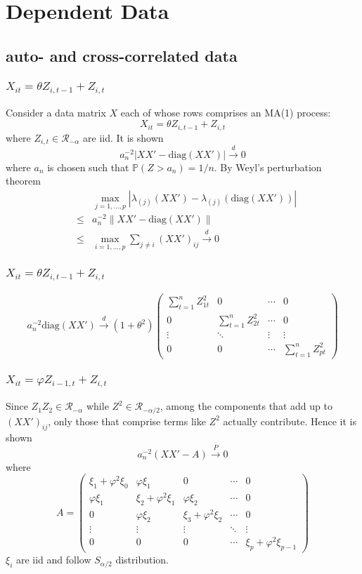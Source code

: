 \documentclass{beamer}
\renewcommand{\P}{
\mathbb P
}
\begin{document}

\section[dependent data]{Dependent Data}
\subsection{auto- and cross-correlated data}
\begin{frame}
\frametitle{$X_{it} = \theta Z_{i, t-1} + Z_{i, t}$}
Consider a data matrix $X$ each of whose rows comprises an MA(1) process:
$$
X_{it} = \theta Z_{i, t-1} + Z_{i, t}
$$
where $Z_{i,t} \in \mathcal R_{-\alpha}$ are iid. It is shown
$$
a_n^{-2} |XX' - \text{diag}(XX')| \overset{d}{\to} 0
$$
where $a_n$ is chosen such that $\P(Z > a_n) = 1/n$. By Weyl's perturbation
theorem
\begin{eqnarray*}
&& \max_{j=1,\dots,p}|\lambda_{(j)}(XX') - \lambda_{(j)}(\text{diag}(XX'))|\\
&\leq& a_n^{-2} \|XX' - \text{diag}(XX')\| \\
&\leq& \max_{i=1,\dots,p}\sum_{j \neq i}(XX')_{ij} \overset{d}{\to} 0
\end{eqnarray*}
\end{frame}

\begin{frame}
  \frametitle{$X_{it} = \theta Z_{i, t-1} + Z_{i, t}$}
  $$
  a_n^{-2}\text{diag}(XX') \overset{d}{\to} (1+\theta^2)
  \begin{pmatrix}
    \sum_{t=1}^n Z_{1t}^2 & 0 & \cdots & 0 \\
    0 & \sum_{t=1}^n Z_{2t}^2 & \cdots & 0 \\
    \vdots & \ddots & \vdots & \vdots \\
    0 & 0 & \cdots & \sum_{t=1}^n Z_{pt}^2
  \end{pmatrix}
  $$
\end{frame}

\begin{frame}
  \frametitle{$X_{it} = \varphi Z_{i-1, t} + Z_{i,t}$}
  Since $Z_1Z_2 \in \mathcal R_{-\alpha}$ while $Z^2 \in \mathcal
  R_{-\alpha/2}$, among the components that add up to $(XX')_{ij}$, only those
  that comprise terms like $Z^2$ actually contribute. Hence it is shown
  $$
  a_n^{-2} (XX' - A) \overset{P}{\to} 0
  $$
  where
  \[
  A =
  \begin{pmatrix}
    \xi_1 + \varphi^2 \xi_0 & \varphi \xi_1 & 0 & \cdots & 0 \\
    \varphi \xi_1 & \xi_2 + \varphi^2 \xi_1 & \varphi \xi_2 & \cdots & 0 \\
    0 & \varphi \xi_2 & \xi_3 + \varphi^2 \xi_2 & \cdots & 0 \\
    \vdots & \vdots & \vdots & \ddots & \vdots \\
    0 & 0 & 0 & \cdots & \xi_p + \varphi^2 \xi_{p-1}
  \end{pmatrix}
  \]
  $\xi_i$ are iid and follow $S_{\alpha/2}$ distribution.
\end{frame}
\end{document}

